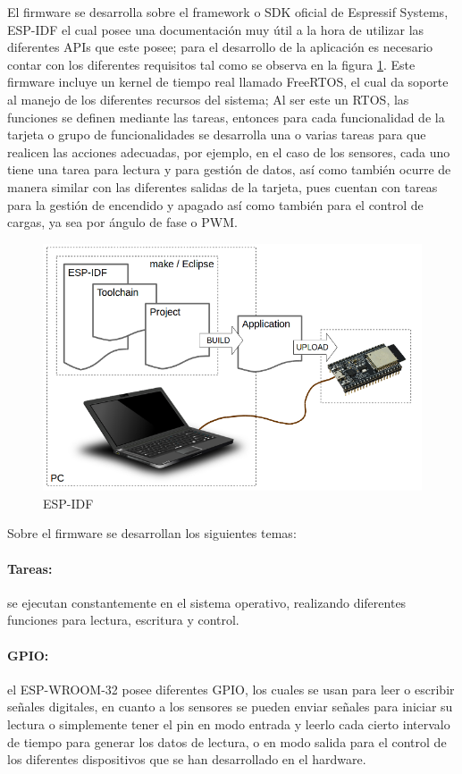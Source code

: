 El firmware se desarrolla sobre el framework o SDK oficial de Espressif Systems, ESP-IDF el cual posee una documentación \cite{ES} muy útil a la hora de utilizar las diferentes APIs que este posee; para el desarrollo de la aplicación es necesario contar con los diferentes requisitos tal como se observa en la figura \ref{fig:what-you-need}. Este firmware incluye un kernel de tiempo real llamado FreeRTOS, el cual da soporte al manejo de los diferentes recursos del sistema; Al ser este  un RTOS, las funciones se definen mediante las tareas, entonces para cada funcionalidad de la tarjeta o grupo de funcionalidades se desarrolla una o varias tareas para que realicen las acciones adecuadas, por ejemplo, en el caso de los sensores, cada uno tiene una tarea para lectura y para gestión de datos, así como también ocurre de manera similar  con las diferentes salidas de la tarjeta, pues cuentan con tareas para la gestión de encendido y apagado así como también para el control de cargas, ya sea por ángulo de fase o PWM.\\

\begin{figure}[H]
	\centering
	\caption{ESP-IDF \cite{ES}}
	\label{fig:what-you-need}
	\includegraphics[width=0.5\linewidth]{Imagenes/what-you-need}
\end{figure}


Sobre el firmware se desarrollan los siguientes temas:

\paragraph{Tareas:}

se ejecutan constantemente en el sistema operativo, realizando diferentes funciones para lectura, escritura y control.

\paragraph{GPIO:}

el ESP-WROOM-32 posee diferentes GPIO, los cuales se usan para leer o escribir señales digitales, en cuanto a los sensores se pueden enviar señales para iniciar su lectura o simplemente tener el pin en modo entrada y leerlo cada cierto intervalo de tiempo para generar los datos de lectura, o en modo salida para el control de los diferentes dispositivos que se han desarrollado en el hardware.


